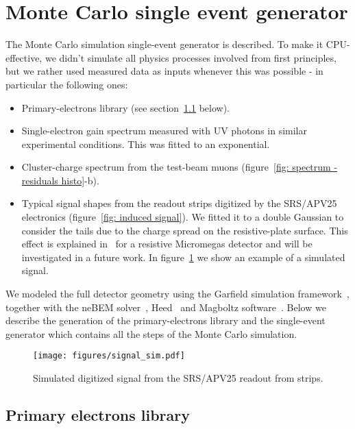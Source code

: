 \appendix

\section{Monte Carlo single event generator}
\label{sec: appendix}
The Monte Carlo simulation single-event generator is described. To make it CPU- effective, we didn't simulate all physics processes involved from first principles, but we rather used measured data as inputs whenever this was possible - in particular the following ones:
\begin{itemize}
\item Primary-electrons library (see section~\ref{sec: PE library} below).
\item Single-electron gain spectrum measured with UV photons in similar experimental conditions. This was fitted to an exponential.
\item Cluster-charge spectrum from the test-beam muons (figure~\ref{fig: spectrum - residuals histo}-b).
\item Typical signal shapes from the readout strips digitized by the SRS/APV25 electronics (figure~\ref{fig: induced signal}). We fitted it to a double Gaussian to consider the tails due to the charge spread on the resistive-plate surface. This effect is explained in~\cite{lin2014signal} for a resistive Micromegas detector and will be investigated in a future work. In figure~\ref{fig: simulated signal} we show an example of a simulated signal. 
\end{itemize}

We modeled the full detector geometry using the Garfield simulation framework~\cite{veenhof2015garfield}, together with the neBEM solver~\cite{muhkopadhyay2006computation}, Heed~\cite{smirnov2005modeling} and Magboltz software~\cite{biagi2016magboltz}. 
Below we describe the generation of the primary-electrons library and the single-event generator which contains all the steps of the Monte Carlo simulation.

\begin{figure}[h]
\centering
\texttt{[image: figures/signal\_sim.pdf]}
\caption{Simulated digitized signal from the SRS/APV25 readout from strips.}\label{fig: simulated signal}
\end{figure}

\subsection{Primary electrons library}
\label{sec: PE library}

